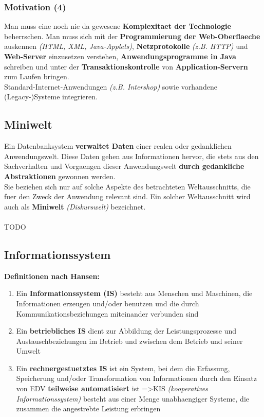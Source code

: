 \documentclass[a4paper,10pt]{article}
\begin{document}
\subsubsection{Motivation (4)}
Man muss eine noch nie da gewesene \textbf{Komplexitaet der Technologie} beherrschen. Man muss sich mit der \textbf{Programmierung der Web-Oberflaeche} auskennen \emph{(HTML, XML, Java-Applets)}, \textbf{Netzprotokolle} \emph{(z.B. HTTP)} und \textbf{Web-Server} einzusetzen verstehen, \textbf{Anwendungsprogramme in Java} schreiben und unter der \textbf{Transaktionskontrolle} von \textbf{Application-Servern} zum Laufen bringen.\\
Standard-Internet-Anwendungen \emph{(z.B. Intershop)} sowie vorhandene (Legacy-)Systeme integrieren.

\subsection{Miniwelt}
Ein Datenbanksystem \textbf{verwaltet Daten} einer realen oder gedanklichen Anwendungswelt. Diese Daten gehen aus Informationen hervor, die stets aus den Sachverhalten und Vorgaengen dieser Anwendungswelt \textbf{durch gedankliche Abstraktionen} gewonnen werden.\\
Sie beziehen sich nur auf solche Aspekte des betrachteten Weltausschnitts, die fuer den Zweck der Anwendung relevant sind. Ein solcher Weltausschnitt wird auch als \textbf{Miniwelt} \emph{(Diskurswelt)} bezeichnet.
\\~\\
TODO

\subsection{Informationssystem}
\textbf{Definitionen nach Hansen:}
\begin{enumerate}
\item Ein \textbf{Informationssystem (IS)} besteht aus Menschen und Maschinen, die Informationen erzeugen und/oder benutzen und die durch Kommunikationsbeziehungen miteinander verbunden sind
\item Ein \textbf{betriebliches IS} dient zur Abbildung der Leistungsprozesse und Austauschbeziehungen im Betrieb und zwischen dem Betrieb und seiner Umwelt
\item Ein \textbf{rechnergestuetztes IS} ist ein System, bei dem die Erfassung, Speicherung und/oder Transformation von Informationen durch den Einsatz von EDV \textbf{teilweise automatisiert} ist =\textgreater KIS \emph{(kooperatives Informationssystem)} besteht aus einer Menge unabhaengiger Systeme, die zusammen die angestrebte Leistung erbringen
\end{enumerate}
\end{document}
